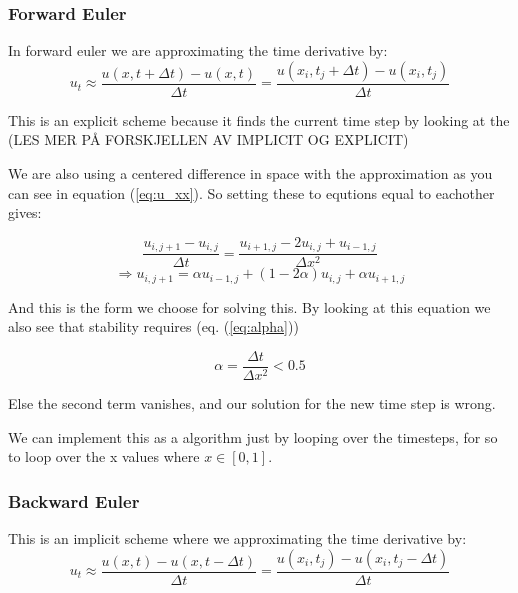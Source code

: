 \documentclass[a4paper,10pt]{article}
\begin{document}
\subsubsection{Forward Euler}

In forward euler we are approximating the time derivative by:
\begin{equation}
u_t\approx \frac{u(x,t+\Delta t)-u(x,t)}{\Delta t}=\frac{u(x_i,t_j+\Delta t)-u(x_i,t_j)}{\Delta t}
\label{eq:forward_euler}
\end{equation}

This is an explicit scheme because it finds the current time step by looking at the (LES MER PÅ FORSKJELLEN AV IMPLICIT OG EXPLICIT)

We are also using a centered difference in space with the approximation as you can see in equation (\ref{eq:u_xx}). So setting these to equtions equal to eachother
 gives:
 
\begin{equation}
\frac{u_{i,j+1} - u_{i,j}}{\Delta t} = \frac{u_{i+1,j} - 2u_{i,j} + u_{i-1,j}}{\Delta x^2} 
\end{equation}
\begin{equation}
 \Rightarrow u_{i,j+1} = \alpha u_{i-1,j} + (1 -2\alpha)u_{i,j} + \alpha u_{i+1,j}
 \label{eq:Forward_eulerScheme}
\end{equation}

And this is the form we choose for solving this. By looking at this equation we also see that stability requires (eq. (\ref{eq:alpha}))

\begin{equation}
\alpha = \frac{\Delta t}{\Delta x^2} < 0.5
\label{eq:alpha}
\end{equation}

Else the second term vanishes, and our solution for the new time step is wrong.

We can implement this as a algorithm just by looping over the timesteps, for so to loop over the 
x values where $x \in [0,1]$.

\subsubsection{Backward Euler}

This is an implicit scheme where we approximating the time derivative by:
\begin{equation}
u_t\approx \frac{u(x,t)-u(x,t-\Delta t)}{\Delta t}=\frac{u(x_i,t_j)-u(x_i,t_j-\Delta t)}{\Delta t}
\label{eq:bacward_Euler}
\end{equation}
\end{document}
